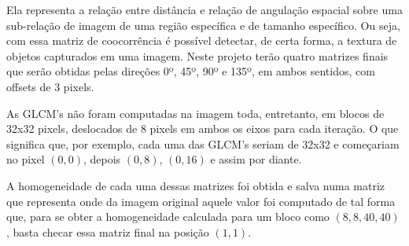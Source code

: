 \documentclass[10pt,twocolumn,letterpaper]{article}
\begin{document}
	Ela representa a relação entre distância e relação de angulação espacial sobre uma
sub-relação de imagem de uma região específica e de tamanho específico. Ou seja, com
essa matriz de coocorrência é possível detectar, de certa forma, a textura de objetos
capturados em uma imagem. Neste projeto terão quatro matrizes finais que serão obtidas
pelas direções 0º, 45º, 90º e 135º, em ambos sentidos, com offsets de 3 pixels.

	As GLCM's não foram computadas na imagem toda, entretanto, em blocos de 32x32
pixels, deslocados de 8 pixels em ambos os eixos para cada iteração. O que significa que,
por exemplo, cada uma das GLCM's seriam de 32x32 e começariam no pixel $(0,0)$, depois
$(0,8)$, $(0,16)$ e assim por diante.

	A homogeneidade de cada uma dessas matrizes foi obtida
e salva numa matriz que representa onde da imagem original aquele valor foi computado
de tal forma que, para se obter a homogeneidade calculada para um bloco como $(8,8, 40,40)$, basta
checar essa matriz final na posição $(1,1)$.
\end{document}

